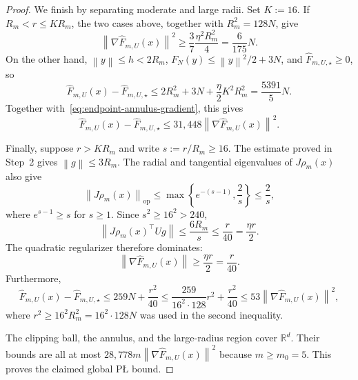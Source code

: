 \documentclass[10pt,a4paper]{amsart}
\newcommand{\R}{\mathbb{R}}
\newcommand{\norm}[1]{\left\lVert #1\right\rVert}
\begin{document}
\begin{proof}
We finish by separating moderate and large radii. Set $K:=16$. If $R_m<r\le KR_m$, the two cases above, together
with $R_m^2=128N$, give
\begin{equation}
\label{eq:endpoint-annulus-gradient}
\norm{\nabla\widehat F_{m,U}(x)}^2
\ge
\frac{3}{7}\frac{\eta^2R_m^2}{4}
=\frac{6}{175}N.
\end{equation}
On the other hand, $\norm{y}\le h<2R_m$, $F_N(y)\le\norm{y}^2/2+3N$, and
$\widehat F_{m,U,\star}\ge0$, so
\[
\widehat F_{m,U}(x)-\widehat F_{m,U,\star}
\le
2R_m^2+3N+\frac{\eta}{2}K^2R_m^2
=\frac{5391}{5}N.
\]
Together with~\eqref{eq:endpoint-annulus-gradient}, this gives
\[
\widehat F_{m,U}(x)-\widehat F_{m,U,\star}
\le
31{,}448\norm{\nabla\widehat F_{m,U}(x)}^2.
\]

Finally, suppose $r>KR_m$ and write $s:=r/R_m\ge16$. The estimate proved in Step~2 gives
$\norm{g}\le3R_m$. The radial and tangential eigenvalues of
$J\rho_m(x)$ also give
\[
\norm{J\rho_m(x)}_{\mathrm{op}}
\le
\max\left\{e^{-(s-1)},\frac{2}{s}\right\}
\le\frac{2}{s},
\]
where $e^{s-1}\ge s$ for $s\ge1$. Since $s^2\ge16^2>240$,
\[
\norm{J\rho_m(x)^\top Ug}
\le
\frac{6R_m}{s}
\le
\frac{r}{40}
=\frac{\eta r}{2}.
\]
The quadratic regularizer therefore dominates:
\[
\norm{\nabla\widehat F_{m,U}(x)}\ge\frac{\eta r}{2}=\frac{r}{40}.
\]
Furthermore,
\[
\widehat F_{m,U}(x)-\widehat F_{m,U,\star}
\le259N+\frac{r^2}{40}
\le\frac{259}{16^2\cdot128}r^2+\frac{r^2}{40}
\le53\norm{\nabla\widehat F_{m,U}(x)}^2,
\]
where $r^2\ge16^2R_m^2=16^2\cdot128N$ was used in the second inequality.

The clipping ball, the annulus, and the large-radius region cover $\R^d$. Their bounds are all at most
$28{,}778m\norm{\nabla\widehat F_{m,U}(x)}^2$ because $m\ge m_0=5$. This proves the claimed global P\L{} bound.
\end{proof}
\end{document}
